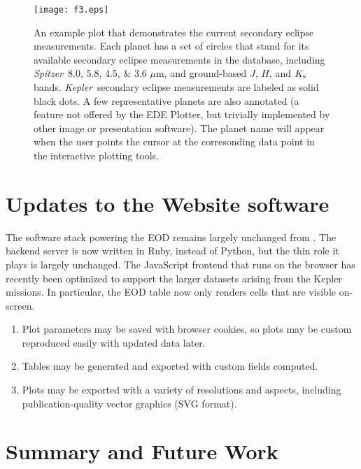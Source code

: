 \documentclass[11pt,preprint]{aastex}
\def\micron{$\mu$m}
\def\kepler{\textit{Kepler}}
\def\spitzer{\textit{Spitzer}}
\def\micron{$\mu$m}
\begin{document}
\begin{CJK*}{UTF8}{gbsn}
\begin{figure}[!htb]
\centering
\texttt{[image: f3.eps]}
\caption{An example plot that demonstrates the current secondary
  eclipse measurements. Each planet has a set of circles that stand
  for its available secondary eclipse measurements in the database,
  including \spitzer\ 8.0, 5.8, 4.5, \& 3.6 \micron, and ground-based
  $J$, $H$, and $K_{\rm s}$ bands. \kepler\ secondary eclipse measurements
  are labeled as solid black dots. A few representative planets are
  also annotated (a feature not offered by the EDE Plotter, but
  trivially implemented by other image or presentation software). The
  planet name will appear when the user points the cursor at the
  corresonding data point in the interactive plotting tools.}
\label{fig:se}
\end{figure}


\section{Updates to the Website software}\label{sec:website}

The software stack powering the EOD remains largely unchanged from
\cite{Wright2011}. The backend server is now written in Ruby, instead
of Python, but the thin role it plays is largely unchanged.  The
JavaScript frontend that runs on the browser has recently been
optimized to support the larger datasets arising from the Kepler
missions.  In particular, the EOD table now only renders cells that
are visible on-screen. 
\begin{enumerate}
\item Plot parameters may be saved with browser cookies, so plots may
  be custom reproduced easily with updated data later. 
\item Tables may be generated and exported with custom fields
  computed. 
\item Plots may be exported with a variety of resolutions and aspects,
  including publication-quality vector graphics (SVG format).  
\end{enumerate}

\section{Summary and Future Work}\label{sec:summary}


\end{CJK*}
\end{document}
